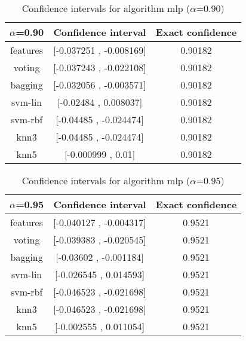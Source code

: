 \documentclass[a4paper,10pt]{article}
\begin{document}
\begin{table}[!htp]
\centering\small
\begin{tabular}{
|c|c|c|}
\hline
 $\alpha$=0.90 & Confidence interval & Exact confidence \\ \hline 
features & [-0.037251 , -0.008169] & 0.90182\\ \hline 
voting & [-0.037243 , -0.022108] & 0.90182\\ \hline 
bagging & [-0.032056 , -0.003571] & 0.90182\\ \hline 
svm-lin & [-0.02484 , 0.008037] & 0.90182\\ \hline 
svm-rbf & [-0.04485 , -0.024474] & 0.90182\\ \hline 
knn3 & [-0.04485 , -0.024474] & 0.90182\\ \hline 
knn5 & [-0.000999 , 0.01] & 0.90182\\ \hline 

\end{tabular}
\caption{Confidence intervals for algorithm mlp ($\alpha$=0.90)}
\end{table}
\begin{table}[!htp]
\centering\small
\begin{tabular}{
|c|c|c|}
\hline
 $\alpha$=0.95 & Confidence interval & Exact confidence \\ \hline 
features & [-0.040127 , -0.004317] & 0.9521\\ \hline 
voting & [-0.039383 , -0.020545] & 0.9521\\ \hline 
bagging & [-0.03602 , -0.001184] & 0.9521\\ \hline 
svm-lin & [-0.026545 , 0.014593] & 0.9521\\ \hline 
svm-rbf & [-0.046523 , -0.021698] & 0.9521\\ \hline 
knn3 & [-0.046523 , -0.021698] & 0.9521\\ \hline 
knn5 & [-0.002555 , 0.011054] & 0.9521\\ \hline 

\end{tabular}
\caption{Confidence intervals for algorithm mlp ($\alpha$=0.95)}
\end{table}

 \clearpage 
\end{document}
